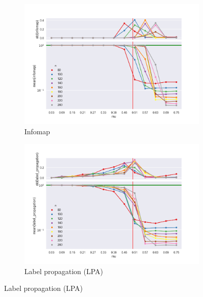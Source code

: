 \begin{figure}
    \begin{subfigure}[b]{0.32\textwidth}
        \includegraphics[width=\textwidth]{fig/ratio_vs_mu_infomap}
        \caption{Infomap}
        \label{fig:mouse}
    \end{subfigure}
    \qquad
    \begin{subfigure}[b]{0.32\textwidth}
        \includegraphics[width=\textwidth]{fig/ratio_vs_mu_label_propagation}
        \caption{Label propagation (LPA)}
        \label{fig:gull}
    \end{subfigure}
      

\end{figure}
